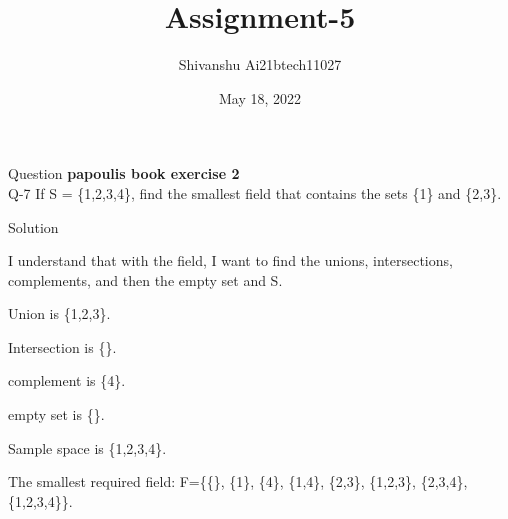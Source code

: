 \documentclass[15pt]{beamer}
\title{Assignment-5}
\author{Shivanshu  Ai21btech11027}
\date{May 18, 2022}
\begin{document}
    \maketitle
    
    \begin{frame}{Question}
     \textbf{papoulis book exercise 2}\\
    \large \noindent Q-7 If S = \{1,2,3,4\}, find the smallest field that contains the sets \{1\} and \{2,3\}.
    \end{frame}
    \begin{frame}{Solution}

        I understand that with the field, I want to find the unions, intersections, complements, and then the empty set and S.
        
        Union is \{1,2,3\}.

        Intersection is \{\}.

        complement is \{4\}.

        empty set is \{\}.

        Sample space is \{1,2,3,4\}.

        The smallest required field: F=\{\{\}, \{1\}, \{4\}, \{1,4\}, \{2,3\}, \{1,2,3\}, \{2,3,4\}, \{1,2,3,4\}\}.
    \end{frame}
       
        
\end{document}
